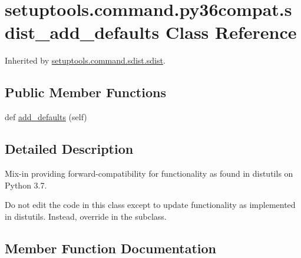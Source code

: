 \hypertarget{classsetuptools_1_1command_1_1py36compat_1_1sdist__add__defaults}{}\section{setuptools.\+command.\+py36compat.\+sdist\+\_\+add\+\_\+defaults Class Reference}
\label{classsetuptools_1_1command_1_1py36compat_1_1sdist__add__defaults}


Inherited by \hyperlink{classsetuptools_1_1command_1_1sdist_1_1sdist}{setuptools.\+command.\+sdist.\+sdist}.

\subsection*{Public Member Functions}
\begin{DoxyCompactItemize}
\item 
def \hyperlink{classsetuptools_1_1command_1_1py36compat_1_1sdist__add__defaults_a91682de24cf13a3d7552a8b35db9a04a}{add\+\_\+defaults} (self)
\end{DoxyCompactItemize}


\subsection{Detailed Description}
\begin{DoxyVerb}Mix-in providing forward-compatibility for functionality as found in
distutils on Python 3.7.

Do not edit the code in this class except to update functionality
as implemented in distutils. Instead, override in the subclass.
\end{DoxyVerb}
 

\subsection{Member Function Documentation}
\mbox{\label{classsetuptools_1_1command_1_1py36compat_1_1sdist__add__defaults_a91682de24cf13a3d7552a8b35db9a04a}} 
